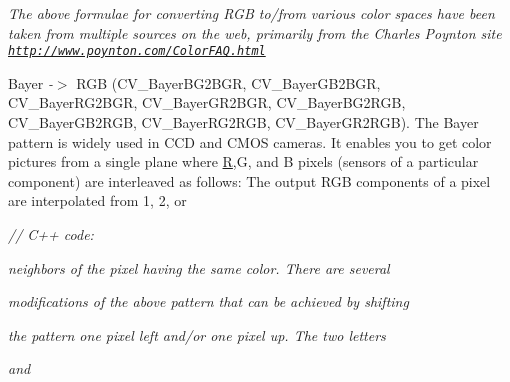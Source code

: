 {\itshape {\itshape }}

{\itshape {\itshape The above formulae for converting R\+GB to/from various color spaces have been taken from multiple sources on the web, primarily from the Charles Poynton site \href{http://www.poynton.com/ColorFAQ.html}{\tt http\+://www.\+poynton.\+com/\+Color\+F\+A\+Q.\+html}}}

{\itshape {\itshape  
\begin{DoxyItemize}
\item Bayer {\itshape -\/$>$} R\+GB ({\ttfamily C\+V\+\_\+\+Bayer\+B\+G2\+B\+GR, C\+V\+\_\+\+Bayer\+G\+B2\+B\+GR, C\+V\+\_\+\+Bayer\+R\+G2\+B\+GR, C\+V\+\_\+\+Bayer\+G\+R2\+B\+GR, C\+V\+\_\+\+Bayer\+B\+G2\+R\+GB, C\+V\+\_\+\+Bayer\+G\+B2\+R\+GB, C\+V\+\_\+\+Bayer\+R\+G2\+R\+GB, C\+V\+\_\+\+Bayer\+G\+R2\+R\+GB}). The Bayer pattern is widely used in C\+CD and C\+M\+OS cameras. It enables you to get color pictures from a single plane where \mbox{\hyperlink{classorg_1_1opencv_1_1_r}{R}},G, and B pixels (sensors of a particular component) are interleaved as follows\+: The output R\+GB components of a pixel are interpolated from 1, 2, or {\ttfamily  }
\end{DoxyItemize}}}

{\itshape {\itshape {\ttfamily }}}

{\itshape {\itshape {\ttfamily // C++ code\+:}}}

{\itshape {\itshape {\ttfamily }}}

{\itshape {\itshape {\ttfamily }}}

{\itshape {\itshape { neighbors of the pixel having the same color. There are several}}}

{\itshape {\itshape {\ttfamily }}}

{\itshape {\itshape {\ttfamily }}}

{\itshape {\itshape {\ttfamily modifications of the above pattern that can be achieved by shifting}}}

{\itshape {\itshape {\ttfamily }}}

{\itshape {\itshape {\ttfamily }}}

{\itshape {\itshape {\ttfamily the pattern one pixel left and/or one pixel up. The two letters}}}

{\itshape {\itshape {\ttfamily }}}

{\itshape {\itshape {\ttfamily }}}

{\itshape {\itshape { and}}}

{\itshape {\itshape {\ttfamily }}}

